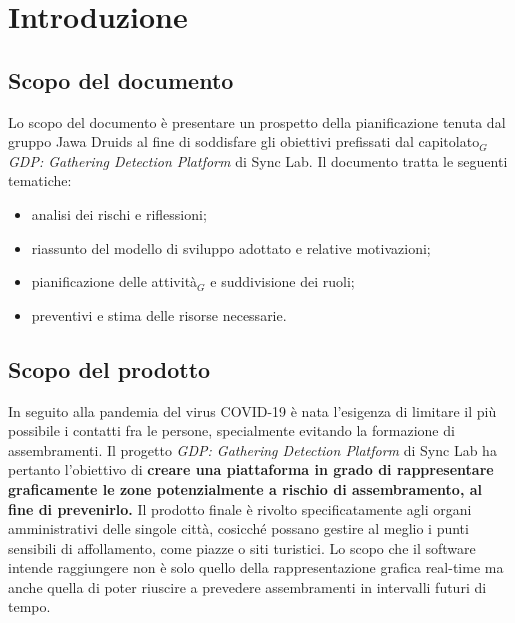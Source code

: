 \chapter{Introduzione}\label{Introduzione}

\section{Scopo del documento}\label{IntorduzioneScopoDelDocumento}
Lo scopo del documento è presentare un prospetto della pianificazione tenuta dal gruppo Jawa Druids al fine di soddisfare gli obiettivi prefissati dal capitolato$_G$ \textit{GDP: Gathering Detection Platform} di Sync Lab. Il documento tratta le seguenti tematiche:
\begin{itemize}
\item analisi dei rischi e riflessioni;
\item riassunto del modello di sviluppo adottato e relative motivazioni;
\item pianificazione delle attività$_G$ e suddivisione dei ruoli;
\item preventivi e stima delle risorse necessarie.
\end{itemize}

\section{Scopo del prodotto}\label{IntroduzioneScopoDelProdotto}
In seguito alla pandemia del virus COVID-19 è nata l'esigenza di limitare il più possibile i contatti fra le persone, specialmente evitando la formazione di assembramenti. Il progetto \textit{GDP: Gathering Detection Platform} di Sync Lab ha pertanto l'obiettivo di \textbf{creare una piattaforma in grado di rappresentare graficamente le zone potenzialmente a rischio di assembramento, al fine di prevenirlo.}
Il prodotto finale è rivolto specificatamente agli organi amministrativi delle singole città, cosicché possano gestire al meglio i punti sensibili di affollamento, come piazze o siti turistici.
Lo scopo che il software intende raggiungere non è solo quello della rappresentazione grafica real-time ma anche quella di poter riuscire a prevedere assembramenti in intervalli futuri di tempo.

